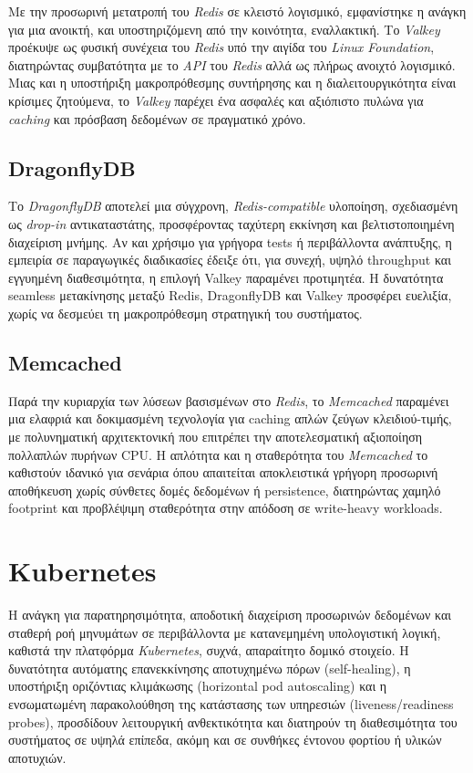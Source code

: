Με την προσωρινή μετατροπή του \textit{Redis} σε κλειστό λογισμικό, εμφανίστηκε
η ανάγκη για μια ανοικτή, και υποστηριζόμενη από την κοινότητα, εναλλακτική. Το
\textit{Valkey} προέκυψε ως φυσική συνέχεια του \textit{Redis} υπό την αιγίδα
του \textit{Linux Foundation}, διατηρώντας συμβατότητα με το \textit{API} του
\textit{Redis} αλλά ως πλήρως ανοιχτό λογισμικό. Μιας και η υποστήριξη
μακροπρόθεσμης συντήρησης και η διαλειτουργικότητα είναι κρίσιμες ζητούμενα, το
\textit{Valkey} παρέχει ένα ασφαλές και αξιόπιστο πυλώνα για \textit{caching}
και πρόσβαση δεδομένων σε πραγματικό χρόνο.

\subsection{DragonflyDB}

Το \textit{DragonflyDB} αποτελεί μια σύγχρονη, \textit{Redis-compatible} υλοποίηση,
σχεδιασμένη ως \textit{drop-in} αντικαταστάτης, προσφέροντας ταχύτερη εκκίνηση και
βελτιστοποιημένη διαχείριση μνήμης. Αν και χρήσιμο για γρήγορα tests ή
περιβάλλοντα ανάπτυξης, η εμπειρία σε παραγωγικές διαδικασίες έδειξε ότι, για
συνεχή, υψηλό throughput και εγγυημένη διαθεσιμότητα, η επιλογή Valkey
παραμένει προτιμητέα. Η δυνατότητα seamless μετακίνησης μεταξύ Redis,
DragonflyDB και Valkey προσφέρει ευελιξία, χωρίς να δεσμεύει τη μακροπρόθεσμη
στρατηγική του συστήματος.

\subsection{Memcached}

Παρά την κυριαρχία των λύσεων βασισμένων στο \textit{Redis}, το
\textit{Memcached} παραμένει μια ελαφριά και δοκιμασμένη τεχνολογία για caching
απλών ζεύγων κλειδιού-τιμής, με πολυνηματική αρχιτεκτονική που επιτρέπει την
αποτελεσματική αξιοποίηση πολλαπλών πυρήνων CPU. Η απλότητα και η σταθερότητα
του \textit{Memcached} το καθιστούν ιδανικό για σενάρια όπου απαιτείται
αποκλειστικά γρήγορη προσωρινή αποθήκευση χωρίς σύνθετες δομές δεδομένων ή
persistence, διατηρώντας χαμηλό footprint και προβλέψιμη σταθερότητα στην
απόδοση σε write-heavy workloads.

\section{Kubernetes}

Η ανάγκη για παρατηρησιμότητα, αποδοτική διαχείριση προσωρινών δεδομένων και
σταθερή ροή μηνυμάτων σε περιβάλλοντα με κατανεμημένη υπολογιστική λογική,
καθιστά την πλατφόρμα \textit{Kubernetes}, συχνά, απαραίτητο δομικό στοιχείο. Η
δυνατότητα αυτόματης επανεκκίνησης αποτυχημένω πόρων (self-healing), η
υποστήριξη οριζόντιας κλιμάκωσης (horizontal pod autoscaling) και η
ενσωματωμένη παρακολούθηση της κατάστασης των υπηρεσιών (liveness/readiness
probes), προσδίδουν λειτουργική ανθεκτικότητα και διατηρούν τη διαθεσιμότητα
του συστήματος σε υψηλά επίπεδα, ακόμη και σε συνθήκες έντονου φορτίου ή υλικών
αποτυχιών.

